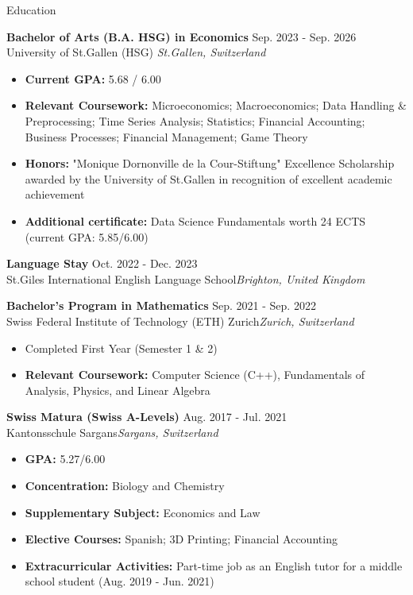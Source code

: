 \documentclass{resume}
\begin{document}
\begin{rSection}{Education}

\textbf{Bachelor of Arts (B.A. HSG) in Economics} \hfill Sep. 2023 - Sep. 2026\\
University of St.Gallen (HSG)
\hfill \textit{St.Gallen, Switzerland}
\begin{itemize}
    \setlength\itemsep{-0.5em}
    \item \textbf{Current GPA:} 5.68 / 6.00
    \item \textbf{Relevant Coursework:}  Microeconomics; Macroeconomics; Data Handling \& Preprocessing; Time Series Analysis; Statistics; Financial Accounting; Business Processes; Financial Management; Game Theory
    \item \textbf{Honors:} "Monique Dornonville de la Cour-Stiftung" Excellence Scholarship awarded by the University of St.Gallen in recognition of excellent academic achievement 
    \item \textbf{Additional certificate:} Data Science Fundamentals worth 24 ECTS (current GPA: 5.85/6.00)
\end{itemize}

\textbf{Language Stay} \hfill Oct. 2022 - Dec. 2023\\
	St.Giles International English Language School\hfill \textit{Brighton, United Kingdom}

	\textbf{Bachelor’s Program in Mathematics } \hfill Sep. 2021 - Sep. 2022\\
	Swiss Federal Institute of Technology (ETH) Zurich\hfill \textit{Zurich, Switzerland}
	\begin{itemize}
    	\setlength\itemsep{-0.5em}
    	\item Completed First Year (Semester 1 \& 2)
    	\item \textbf{Relevant Coursework:}  Computer Science (C++), Fundamentals of Analysis, Physics, and Linear Algebra 
	\end{itemize}
    \textbf{Swiss Matura (Swiss A-Levels)} \hfill Aug. 2017 - Jul. 2021\\
	Kantonsschule Sargans\hfill \textit{Sargans, Switzerland}
	\begin{itemize}
    	\setlength\itemsep{-0.5em}
    	\item \textbf{GPA:} 5.27/6.00
            \item \textbf{Concentration:} Biology and Chemistry
            \item \textbf{Supplementary Subject:} Economics and Law
            \item \textbf{Elective Courses:} Spanish; 3D Printing; Financial Accounting
    	\item \textbf{Extracurricular Activities:} Part-time job as an English tutor for a middle school student (Aug. 2019 - Jun. 2021) 
	\end{itemize}
	\end{rSection}
\end{document}
